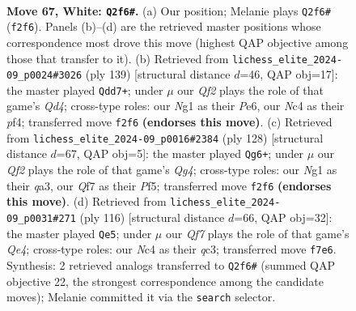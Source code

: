 \documentclass[11pt]{article}
\begin{document}
\clearpage

\begin{figure}[p]\centering
\begin{subfigure}{0.46\textwidth}\centering
\resizebox{\linewidth}{!}{%
\newchessgame
\chessboard[
  setfen={8/5Q2/8/p2P2kp/2N3p1/8/5Q2/5KN1 w - - 0 67},
  showmover=false,
  pgfstyle=straightmove, color=movearrow, markmove={f2-f6}
]}
\caption{}
\end{subfigure}\hfill
\begin{subfigure}{0.46\textwidth}\centering
\resizebox{\linewidth}{!}{%
\newchessgame
\chessboard[
  setfen={4K3/kq4P1/4p3/3q4/5P2/2Q5/1P6/8 b - - 10 70},
  showmover=false,
  pgfstyle=straightmove, color=movearrow, markmove={d5-d7}
]}
\caption{}
\end{subfigure}
\\[4pt]
\begin{subfigure}{0.46\textwidth}\centering
\resizebox{\linewidth}{!}{%
\newchessgame
\chessboard[
  setfen={8/7k/7p/5P1K/6Q1/q6P/8/8 w - - 0 65},
  showmover=false,
  pgfstyle=straightmove, color=movearrow, markmove={g4-g6}
]}
\caption{}
\end{subfigure}\hfill
\begin{subfigure}{0.46\textwidth}\centering
\resizebox{\linewidth}{!}{%
\newchessgame
\chessboard[
  setfen={8/8/2P3pk/7p/4QK2/2q5/8/8 w - - 0 59},
  showmover=false,
  pgfstyle=straightmove, color=movearrow, markmove={e4-e5}
]}
\caption{}
\end{subfigure}
\caption{\textbf{Move 67, White: \texttt{Q2f6\#}.} (a) Our position; Melanie plays \texttt{Q2f6\#} (\texttt{f2f6}). Panels (b)--(d) are the retrieved master positions whose correspondence most drove this move (highest QAP objective among those that transfer to it). (b) Retrieved from \texttt{lichess\_elite\_2024-09\_p0024\#3026} (ply 139) [structural distance $d$=46, QAP obj=17]: the master played \texttt{Qdd7+}; under $\mu$ our \emph{Qf2} plays the role of that game's \emph{Qd4}; cross-type roles: our \emph{N}g1 as their \emph{P}e6, our \emph{N}c4 as their \emph{p}f4; transferred move \texttt{f2f6} \textbf{(endorses this move)}. (c) Retrieved from \texttt{lichess\_elite\_2024-09\_p0016\#2384} (ply 128) [structural distance $d$=67, QAP obj=5]: the master played \texttt{Qg6+}; under $\mu$ our \emph{Qf2} plays the role of that game's \emph{Qg4}; cross-type roles: our \emph{N}g1 as their \emph{q}a3, our \emph{Q}f7 as their \emph{P}f5; transferred move \texttt{f2f6} \textbf{(endorses this move)}. (d) Retrieved from \texttt{lichess\_elite\_2024-09\_p0031\#271} (ply 116) [structural distance $d$=66, QAP obj=32]: the master played \texttt{Qe5}; under $\mu$ our \emph{Qf7} plays the role of that game's \emph{Qe4}; cross-type roles: our \emph{N}c4 as their \emph{q}c3; transferred move \texttt{f7e6}. Synthesis: 2 retrieved analogs transferred to \texttt{Q2f6\#} (summed QAP objective 22, the strongest correspondence among the candidate moves); Melanie committed it via the \texttt{search} selector.}
\label{fig:thought-m132}
\end{figure}
\end{document}
